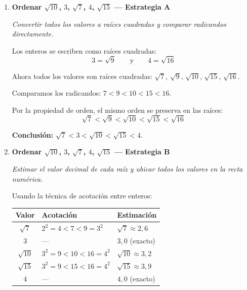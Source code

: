 \documentclass[11pt, letterpaper]{article}
\begin{document}
\begin{tcolorbox}[examplebox, title={Ejemplos}]
\begin{enumerate}[label=\textbf{Ej. \arabic*.}, leftmargin=*, itemsep=18pt]
Calculamos la distancia de 75 a cada cuadrado:
\begin{itemize}[itemsep=3pt]
  \item Distancia a $8^2 = 64$: \quad $75 - 64 = 11$
  \item Distancia a $9^2 = 81$: \quad $81 - 75 = \phantom{1}6$
\end{itemize}

Como 75 está más cerca de 81 (distancia 6) que de 64 (distancia 11), la raíz $\sqrt{75}$ está más cerca de 9 que de 8.

\medskip
\textbf{Conclusión:} $\sqrt{75} < 9$, y $\sqrt{75} \approx 8{,}66$.

\item \textbf{Ordenar $\sqrt{10}$, $3$, $\sqrt{7}$, $4$, $\sqrt{15}$ — Estrategia A}

\textit{Convertir todos los valores a raíces cuadradas y comparar radicandos directamente.}

\medskip
Los enteros se escriben como raíces cuadradas:
$$3 = \sqrt{9} \qquad\text{y}\qquad 4 = \sqrt{16}$$

Ahora todos los valores son raíces cuadradas: $\sqrt{7}$, $\sqrt{9}$, $\sqrt{10}$, $\sqrt{15}$, $\sqrt{16}$.

Comparamos los radicandos: $7 < 9 < 10 < 15 < 16$.

Por la propiedad de orden, el mismo orden se preserva en las raíces:
$$\sqrt{7} < \sqrt{9} < \sqrt{10} < \sqrt{15} < \sqrt{16}$$

\medskip
\textbf{Conclusión:} $\sqrt{7} < 3 < \sqrt{10} < \sqrt{15} < 4$.

\item \textbf{Ordenar $\sqrt{10}$, $3$, $\sqrt{7}$, $4$, $\sqrt{15}$ — Estrategia B}

\textit{Estimar el valor decimal de cada raíz y ubicar todos los valores en la recta numérica.}

\medskip
Usando la técnica de acotación entre enteros:

\medskip
\begin{center}
\renewcommand{\arraystretch}{1.3}
\begin{tabular}{c l l}
\toprule
\textbf{Valor} & \textbf{Acotación} & \textbf{Estimación}\\
\midrule
$\sqrt{7}$  & $2^2=4 < 7 < 9=3^2$ & $\sqrt{7}\approx 2{,}6$\\
$3$         & --- & $3{,}0$ (exacto)\\
$\sqrt{10}$ & $3^2=9 < 10 < 16=4^2$ & $\sqrt{10}\approx 3{,}2$\\
$\sqrt{15}$ & $3^2=9 < 15 < 16=4^2$ & $\sqrt{15}\approx 3{,}9$\\
$4$         & --- & $4{,}0$ (exacto)\\
\bottomrule
\end{tabular}
\end{center}


\end{enumerate}
\end{tcolorbox}
\end{document}
